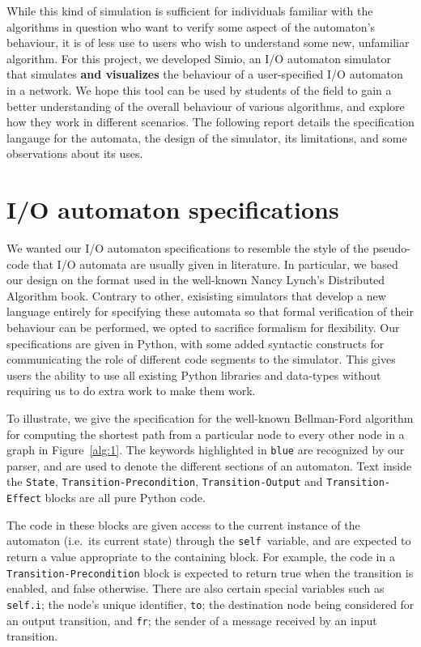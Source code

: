 \documentclass{scrartcl}
\def \kw#1{\texttt{\color{MidnightBlue}#1}}
\def \self {\texttt{\color{Cerulean}self}}
\begin{document}
While this kind of simulation is sufficient for individuals familiar with the
algorithms in question who want to verify some aspect of the automaton's
behaviour, it is of less use to users who wish to understand some new,
unfamiliar algorithm. For this project, we developed Simio, an I/O automaton
simulator that simulates \textbf{and visualizes} the behaviour of a
user-specified I/O automaton in a network. We hope this tool can be used by
students of the field to gain a better understanding of the overall behaviour
of various algorithms, and explore how they work in different scenarios. The
following report details the specification langauge for the automata, the
design of the simulator, its limitations, and some observations about its uses.

\section{I/O automaton specifications}
We wanted our I/O automaton specifications to resemble the style of the
pseudo-code that I/O automata are usually given in literature. In particular,
we based our design on the format used in the well-known Nancy Lynch's
Distributed Algorithm book. Contrary to other, exisisting simulators that
develop a new language entirely for specifying these automata so that formal
verification of their behaviour can be performed, we opted to sacrifice
formalism for flexibility. Our specifications are given in Python, with some
added syntactic constructs for communicating the role of different code
segments to the simulator. This gives users the ability to use all existing
Python libraries and data-types without requiring us to do extra work to make
them work.

To illustrate, we give the specification for the well-known Bellman-Ford
algorithm for computing the shortest path from a particular node to every other
node in a graph in Figure~\ref{alg:1}. The keywords highlighted in \kw{blue}
are recognized by our parser, and are used to denote the different sections of
an automaton. Text inside the \kw{State}, \kw{Transition-Precondition},
\kw{Transition-Output} and \kw{Transition-Effect} blocks are all pure Python
code.

The code in these blocks are given access to the current instance of the
automaton (i.e.\ its current state) through the \self\ variable, and are
expected to return a value appropriate to the containing block. For example,
the code in a \kw{Transition-Precondition} block is expected to return true
when the transition is enabled, and false otherwise. There are also certain
special variables such as \kw{self.i}; the node's unique identifier, \kw{to};
the destination node being considered for an output transition, and \kw{fr};
the sender of a message received by an input transition.
\end{document}
